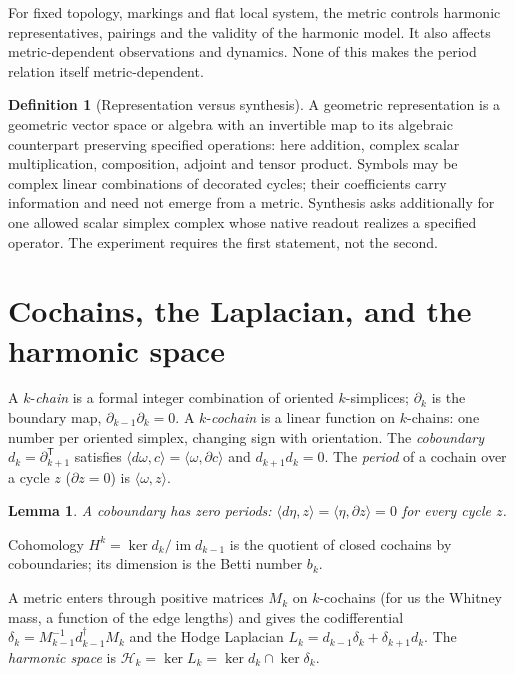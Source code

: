 \documentclass[11pt]{article}
\newtheorem{lemma}[theorem]{Lemma}
\theoremstyle{definition}
\newtheorem{definition}[theorem]{Definition}
\theoremstyle{remark}
\newcommand{\im}{\operatorname{im}}
\newcommand{\Hgroup}{\mathcal{H}}
\begin{document}
For fixed topology, markings and flat local system, the metric controls
harmonic representatives, pairings and the validity of the harmonic model.
It also affects metric-dependent observations and dynamics. None of this
makes the period relation itself metric-dependent.

\begin{definition}[Representation versus synthesis]\label{def:representation}
A geometric representation is a geometric vector space or algebra with an
invertible map to its algebraic counterpart preserving specified operations:
here addition, complex scalar multiplication, composition, adjoint and
tensor product. Symbols may be complex linear combinations of decorated
cycles; their coefficients carry information and need not emerge from a
metric. Synthesis asks additionally for one allowed scalar simplex complex
whose native readout realizes a specified operator. The experiment
requires the first statement, not the second.
\end{definition}

\section{Cochains, the Laplacian, and the harmonic space}\label{sec:cochains}

A $k$-\emph{chain} is a formal integer combination of oriented
$k$-simplices; $\partial_k$ is the boundary map, $\partial_{k-1}\partial_k = 0$.
A $k$-\emph{cochain} is a linear function on $k$-chains: one number per
oriented simplex, changing sign with orientation. The \emph{coboundary}
$d_k = \partial_{k+1}^{\mathsf T}$ satisfies $\langle d\omega, c\rangle =
\langle \omega, \partial c\rangle$ and $d_{k+1} d_k = 0$. The \emph{period}
of a cochain over a cycle $z$ ($\partial z = 0$) is $\langle \omega, z\rangle$.

\begin{lemma}\label{lem:exact}
A coboundary has zero periods: $\langle d\eta, z\rangle = \langle \eta,
\partial z\rangle = 0$ for every cycle $z$.
\end{lemma}

Cohomology $H^k = \ker d_k / \im d_{k-1}$ is the quotient of closed cochains
by coboundaries; its dimension is the Betti number $b_k$.

A metric enters through positive matrices $M_k$ on $k$-cochains (for us the
Whitney mass, a function of the edge lengths) and gives the codifferential
$\delta_k = M_{k-1}^{-1} d_{k-1}^{\dagger} M_k$ and the Hodge Laplacian
$L_k = d_{k-1}\delta_k + \delta_{k+1} d_k$. The \emph{harmonic space} is
$\Hgroup_k = \ker L_k = \ker d_k \cap \ker \delta_k$.
\end{document}
